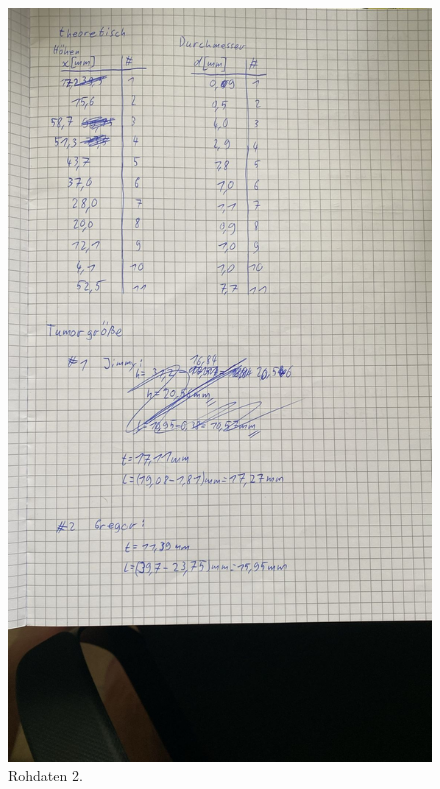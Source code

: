 \begin{figure}[H]
  \includegraphics[width=\textwidth]{Bilder/messdaten2.jpg}
  \caption{Rohdaten 2.}
  \label{fig:2}
\end{figure}

